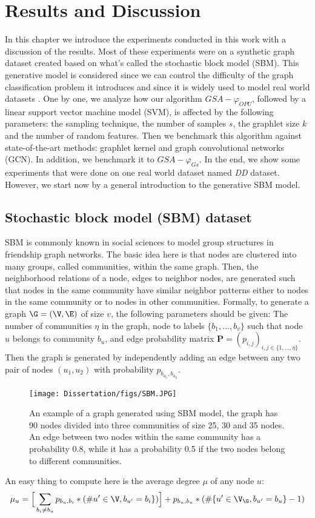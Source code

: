 \addchapheadtotoc
\chapter{Results and Discussion}
In this chapter we introduce the experiments conducted in this work  with a discussion of the results. Most of these experiments were on a synthetic graph dataset created based on what's called the stochastic block model (SBM). This generative model is considered since we can control the difficulty of the graph classification problem it introduces and since it is widely used to model real world datasets \citep{SBM}. \newline
One by one, we analyze how our algorithm $GSA-\varphi_{OPU}$, followed by a linear support vector machine model (SVM), is affected by the following parameters: the sampling technique, the number of samples $s$, the graphlet size $k$ and the number of random features.
Then we benchmark this algorithm against state-of-the-art methods: graphlet kernel and graph convolutional networks (GCN). In addition, we benchmark it to $GSA-\varphi_{Gs}$.
In the end, we show some experiments that were done on one real world dataset named \emph{DD} dataset. However, we start now by a general introduction to the generative SBM model. 
\section{Stochastic block model (SBM) dataset}
SBM is commonly known in social sciences to model group structures in friendship graph networks\citep{SBM}. The basic idea here is that nodes  are clustered into many groups, called communities, within the same graph. Then, the neighborhood relations of a node, edges to neighbor nodes, are generated such that nodes in the same community have similar neighbor patterns either to nodes in the same community or to nodes in other communities. \newline
Formally, to generate a graph $\G=(\V,\E)$ of size $v$, the following parameters should be given: The number of communities $\eta$ in the graph, node to labels $\{b_1 , \ldots ,b_v\}$ such that node $u$ belongs to community $b_u$, and edge probability matrix $\mathbf{P}=(p_{i,j})_{i,j\in\{1,\ldots, \eta\}}$.
Then the graph is generated by independently adding an edge between any two pair of nodes $(u_1,u_2)$ with probability $p_{b_{u_1} , b_{u_2}}$. \newline
\begin{figure}[H]
\centering
\texttt{[image: Dissertation/figs/SBM.JPG]}
\caption[Visualization of an SBM-based graph example]{An example of a graph generated using SBM model, the graph has 90 nodes divided into three communities of size 25, 30 and 35 nodes. An edge between two nodes within the same community has a probability 0.8, while it has a probability 0.5 if the two nodes belong to different communities.}
\label{fig:SBM_example}
\end{figure}
An easy thing to compute here is the average degree $\mu$ of any node $u$:
\begin{equation}
    \mu_u=\Big[\sum_{b_i\neq b_u} p_{b_u,b_i}*(\#u'\in \V, b_{u'}=b_i \} )\Big]+p_{b_u,b_u}*(\#\{u'\in \V_\G, b_{u'}=b_u \}-1 )
\end{equation}
